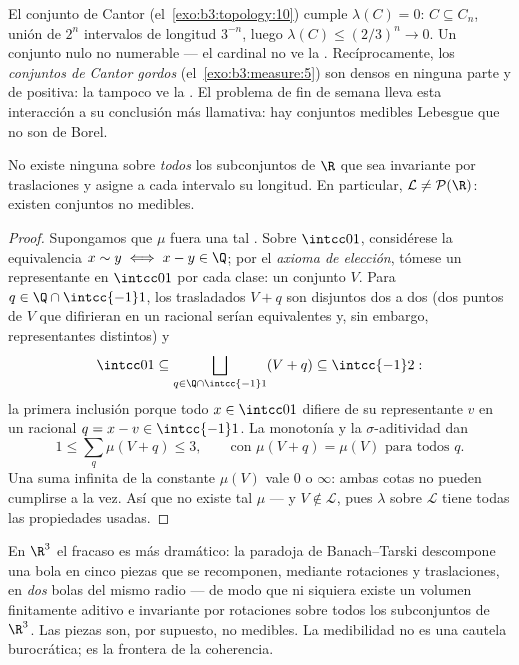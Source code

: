 \begin{example}\label{ex:b3:measure:cantor}
El conjunto de Cantor (el~\cref{exo:b3:topology:10}) cumple
$\lambda(C) = 0$: $C \subseteq C_n$, unión de $2^n$ intervalos de
longitud $3^{-n}$, luego $\lambda(C) \leq (2/3)^n \to 0$. Un conjunto
nulo no numerable --- el cardinal no ve la
. Recíprocamente, los
\emph{conjuntos de Cantor gordos} (el~\cref{exo:b3:measure:5}) son
densos en ninguna parte y de 
positiva: la  tampoco ve la
. El problema de fin de semana
lleva esta interacción a su conclusión más llamativa: hay conjuntos
medibles Lebesgue que no son de Borel.
\end{example}

\begin{theorem}[Vitali]\label{thm:b3:measure:vitali}
No existe ninguna  sobre
\emph{todos} los subconjuntos de $\R$ que sea invariante por
traslaciones y asigne a cada intervalo su longitud. En particular,
$\mathcal L \neq \mathcal P(\R)$: existen conjuntos no
medibles.
\end{theorem}

\begin{proof}
Supongamos que $\mu$ fuera una tal . Sobre $\intcc01$, considérese
la equivalencia $x \sim y \iff x - y \in \Q$; por el \emph{axioma de
elección}, tómese un representante en $\intcc01$ por cada clase: un
conjunto $V$. Para $q \in \Q\cap\intcc{-1}1$, los trasladados $V + q$
son disjuntos dos a dos (dos puntos de $V$ que difirieran en un racional
serían equivalentes y, sin embargo, representantes distintos) y
\[
\intcc01 \subseteq \bigsqcup_{q \in \Q\cap\intcc{-1}1}(V + q)
\subseteq \intcc{-1}2 :
\]
la primera inclusión porque todo $x \in \intcc01$ difiere de su
representante $v$ en un racional $q = x - v \in
\intcc{-1}1$. La monotonía y la $\sigma$-aditividad dan
\[
1 \leq \sum_{q}\mu(V + q) \leq 3,
\qquad\text{con } \mu(V + q) = \mu(V) \text{ para todos } q .
\]
Una suma infinita de la constante $\mu(V)$ vale $0$ o $\infty$: ambas
cotas no pueden cumplirse a la vez. Así que no existe tal $\mu$ --- y $V
\notin \mathcal L$, pues $\lambda$ sobre $\mathcal L$ tiene todas las
propiedades usadas.
\end{proof}

\begin{remark}\label{rem:b3:measure:banachtarski}
En $\R^3$ el fracaso es más dramático: la paradoja de Banach--Tarski
descompone una bola en cinco piezas que se recomponen, mediante
rotaciones y traslaciones, en \emph{dos} bolas del mismo radio --- de
modo que ni siquiera existe un volumen finitamente aditivo e invariante
por rotaciones sobre todos los subconjuntos de $\R^3$. Las piezas son,
por supuesto, no medibles. La medibilidad no es una cautela burocrática;
es la frontera de la coherencia.
\end{remark}

